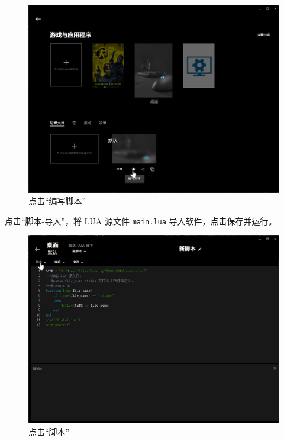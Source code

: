 \begin{figure}[H]
    \Centering
    \includegraphics[width=\textwidth]{docs/assets/script.png}
    \caption{点击“编写脚本”}
\end{figure}

点击“脚本-导入”，将 LUA 源文件 \lstinline{main.lua} 导入软件，点击保存并运行。

\begin{figure}[H]
    \Centering
    \includegraphics[width=\textwidth]{docs/assets/edit.png}
    \caption{点击“脚本”}
\end{figure}

